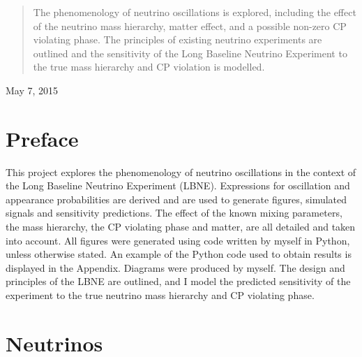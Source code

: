 \documentclass[12pt]{article}
\begin{document}
\begin{titlepage}
\begin{center}
\begin{abstract}
\begin{center}
\noindent The phenomenology of neutrino oscillations is explored, including the effect of the neutrino mass hierarchy, matter effect, and a possible non-zero CP violating phase. The principles of existing neutrino experiments are outlined and the sensitivity of the Long Baseline Neutrino Experiment to the true mass hierarchy and CP violation is modelled.
\end{center}
\end{abstract}

\vfill
{\large May 7, 2015}
\end{center}
\end{titlepage}
\section*{Preface}
This project explores the phenomenology of neutrino oscillations in the context of the Long Baseline Neutrino Experiment (LBNE). Expressions for oscillation and appearance probabilities are derived and are used to generate figures, simulated signals and sensitivity predictions. The effect of the known mixing parameters, the mass hierarchy, the CP violating phase and matter, are all detailed and taken into account. All figures were generated using code written by myself in Python, unless otherwise stated. An example of the Python code used to obtain results is displayed in the Appendix. Diagrams were produced by myself. The design and principles of the LBNE are outlined, and I model the predicted sensitivity of the experiment to the true neutrino mass hierarchy and CP violating phase.
\newpage
\tableofcontents
{}
\newpage
\section{Neutrinos}
\end{document}
